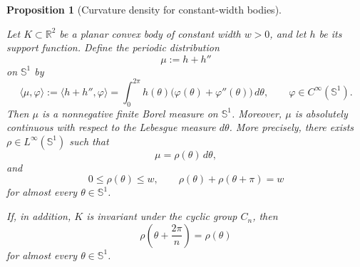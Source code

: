 \documentclass[11pt,letterpaper,reqno]{amsart}
\newtheorem{proposition}[theorem]{Proposition}
\begin{document}
\begin{proposition}[Curvature density for constant-width bodies]
\label{prop:ac-curvature}

Let $K\subset\mathbb{R}^{2}$ be a planar convex body of constant
width $w>0$, and let $h$ be its support function. Define the periodic
distribution
\[
    \mu:=h+h''
\]
on $\mathbb{S}^{1}$ by
\[
    \langle \mu,\varphi\rangle
    :=
    \langle h+h'',\varphi\rangle
    =
    \int_{0}^{2\pi}
        h(\theta)
        \bigl(\varphi(\theta)+\varphi''(\theta)\bigr)
    \,d\theta,
    \qquad
    \varphi\in C^{\infty}(\mathbb{S}^{1}).
\]
Then $\mu$ is a nonnegative finite Borel measure on $\mathbb{S}^{1}$.
Moreover, $\mu$ is absolutely continuous with respect to the
Lebesgue measure $d\theta$. More precisely, there exists
$\rho\in L^{\infty}(\mathbb{S}^{1})$ such that
\[
    \mu=\rho(\theta)\,d\theta,
\]
and
\[
    0\leq \rho(\theta)\leq w,
    \qquad
    \rho(\theta)+\rho(\theta+\pi)=w
\]
for almost every $\theta\in\mathbb{S}^{1}$.

If, in addition, $K$ is invariant under the cyclic group $C_n$,
then
\[
    \rho\left(\theta+\frac{2\pi}{n}\right)
    =
    \rho(\theta)
\]
for almost every $\theta\in\mathbb{S}^{1}$.
\end{proposition}

\end{document}
